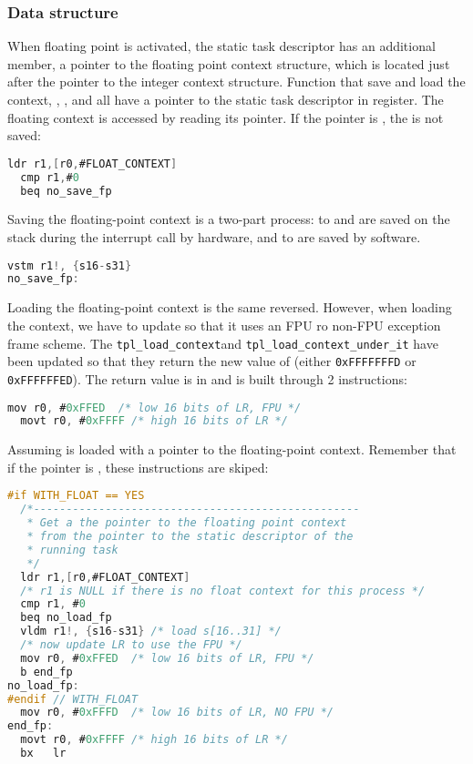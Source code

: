 \subsubsection{Data structure}


When floating point is activated, the static task descriptor has an additional member, a pointer to the floating point context structure, which is located just after the pointer to the integer context structure. Function that save and load the context, , ,  and  all have a pointer to the static task descriptor in  register. The floating context is accessed by reading its pointer. If the pointer is , the is not saved:

\begin{lstlisting}[language=C]
  ldr r1,[r0,#FLOAT_CONTEXT]
  cmp r1,#0
  beq no_save_fp
\end{lstlisting}

Saving the floating-point context is a two-part process:  to  and  are saved on the stack during the interrupt call by hardware, and  to  are saved by software.

\begin{lstlisting}[language=C]
  vstm r1!, {s16-s31}
no_save_fp:
\end{lstlisting}

Loading the floating-point context is the same reversed. However, when loading the context, we have to update  so that it uses an FPU ro non-FPU exception frame scheme. The \lstinline|tpl_load_context|and \lstinline|tpl_load_context_under_it| have been updated so that they return the new value of  (either \texttt{0xFFFFFFFD} or \texttt{0xFFFFFFED}). The return value is in  and is built through 2 instructions:

\begin{lstlisting}[language=C]
  mov r0, #0xFFED  /* low 16 bits of LR, FPU */
  movt r0, #0xFFFF /* high 16 bits of LR */
\end{lstlisting}


Assuming  is loaded with a pointer to the floating-point context. Remember that if the pointer is , these instructions are skiped:

\begin{lstlisting}[language=C]
  #if WITH_FLOAT == YES
  /*--------------------------------------------------
   * Get a the pointer to the floating point context 
   * from the pointer to the static descriptor of the 
   * running task
   */
  ldr r1,[r0,#FLOAT_CONTEXT]
  /* r1 is NULL if there is no float context for this process */
  cmp r1, #0
  beq no_load_fp
  vldm r1!, {s16-s31} /* load s[16..31] */
  /* now update LR to use the FPU */
  mov r0, #0xFFED  /* low 16 bits of LR, FPU */
  b end_fp 
no_load_fp:
#endif // WITH_FLOAT
  mov r0, #0xFFFD  /* low 16 bits of LR, NO FPU */
end_fp:
  movt r0, #0xFFFF /* high 16 bits of LR */
  bx   lr
\end{lstlisting}

